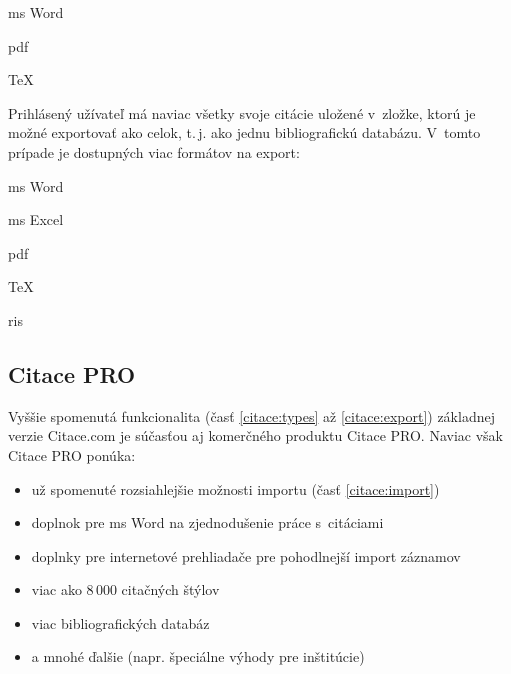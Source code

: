 \documentclass[
  color,
  table,
  nolof,
  oneside,
]{fithesis3}
\begin{document}
\begin{center}
\hspace*{\fill}
\begin{inparaitem}
\item \gls{ms} Word \hfill
\item \gls{pdf} \hfill
\item \BibTeX \hfill
\item \TeX
\end{inparaitem}
\hspace*{\fill}
\end{center}

\noindent Prihlásený užívateľ má naviac všetky svoje citácie uložené v~zložke, ktorú je možné exportovať ako celok, t.\,j. ako jednu bibliografickú databázu. V~tomto prípade je dostupných viac formátov na export:

\begin{center}
\hspace*{\fill}
\begin{inparaitem}
\item \gls{ms} Word \hfill
\item \gls{ms} Excel \hfill
\item \gls{pdf} \hfill
\item \BibTeX \hfill
\item \TeX \hfill
\item \gls{ris}
\end{inparaitem}
\hspace*{\fill}
\end{center}

\subsection{Citace PRO}\label{citace:pro}

Vyššie spomenutá funkcionalita (časť \ref{citace:types} až \ref{citace:export}) základnej verzie Citace.com je súčasťou aj komerčného produktu Citace PRO. Naviac však Citace PRO ponúka:

\begin{itemize}
\item už spomenuté rozsiahlejšie možnosti importu (časť \ref{citace:import})
\item doplnok pre \gls{ms} Word na zjednodušenie práce s~citáciami
\item doplnky pre internetové prehliadače pre pohodlnejší import záznamov
\item viac ako 8\,000 citačných štýlov
\item viac bibliografických databáz
\item a mnohé ďalšie (napr. špeciálne výhody pre inštitúcie)
\end{itemize}
\end{document}
